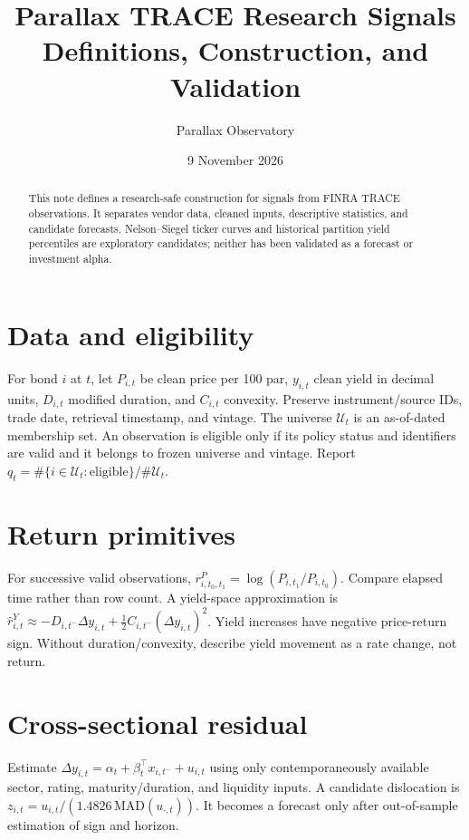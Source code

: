 \documentclass[11pt]{article}
\title{Parallax TRACE Research Signals\\\large Definitions, Construction, and Validation}
\author{Parallax Observatory}
\date{9 November 2026}
\begin{document}
\maketitle
\begin{abstract}
This note defines a research-safe construction for signals from FINRA TRACE observations. It separates vendor data, cleaned inputs, descriptive statistics, and candidate forecasts. Nelson--Siegel ticker curves and historical partition yield percentiles are exploratory candidates; neither has been validated as a forecast or investment alpha.
\end{abstract}
\section{Data and eligibility}
For bond $i$ at $t$, let $P_{i,t}$ be clean price per 100 par, $y_{i,t}$ clean yield in decimal units, $D_{i,t}$ modified duration, and $C_{i,t}$ convexity. Preserve instrument/source IDs, trade date, retrieval timestamp, and vintage. The universe $\mathcal U_t$ is an as-of-dated membership set. An observation is eligible only if its policy status and identifiers are valid and it belongs to frozen universe and vintage. Report $q_t=\#\{i\in\mathcal U_t:\mathrm{eligible}\}/\#\mathcal U_t$.
\section{Return primitives}
For successive valid observations, $r^P_{i,t_0,t_1}=\log(P_{i,t_1}/P_{i,t_0})$. Compare elapsed time rather than row count. A yield-space approximation is $\widehat r^Y_{i,t}\approx-D_{i,t^-}\Delta y_{i,t}+\frac12C_{i,t^-}(\Delta y_{i,t})^2$. Yield increases have negative price-return sign. Without duration/convexity, describe yield movement as a rate change, not return.
\section{Cross-sectional residual}
Estimate $\Delta y_{i,t}=\alpha_t+\beta_t^\top x_{i,t^-}+u_{i,t}$ using only contemporaneously available sector, rating, maturity/duration, and liquidity inputs. A candidate dislocation is $z_{i,t}=u_{i,t}/(1.4826\,\mathrm{MAD}(u_{\cdot,t}))$. It becomes a forecast only after out-of-sample estimation of sign and horizon.
\end{document}
